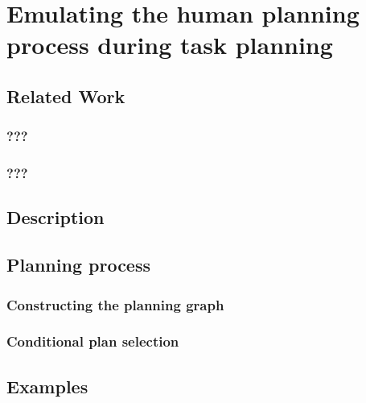 \documentclass[a4paper,11pt,twoside]{StyleThese}
\begin{document}
\setcounter{chapter}{3} %
\dominitoc
\faketableofcontents
\fi

\chapter{Emulating the human planning process during task planning}
\minitoc

\section{Related Work}
\subsection{???}

\subsection{???}

\section{Description}

\section{Planning process}

\subsection{Constructing the planning graph}

\subsection{Conditional plan selection}

\section{Examples}

\ifdefined{}
\else


\end{document}
